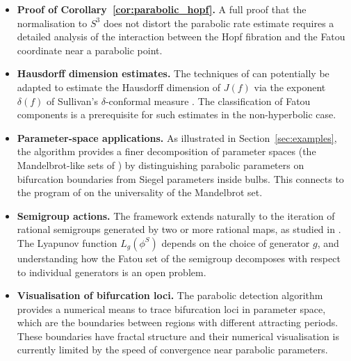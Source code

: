 \documentclass[12pt]{article}
\theoremstyle{definition}
\begin{document}
\begin{itemize}
  \item \textbf{Proof of Corollary~\ref{cor:parabolic_hopf}.}  A
        full proof that the normalisation to $S^3$ does not distort the
        parabolic rate estimate requires a detailed analysis of the
        interaction between the Hopf fibration and the Fatou coordinate
        near a parabolic point.

  \item \textbf{Hausdorff dimension estimates.}  The techniques of
        \cite{Alvarez2023} can potentially be adapted to estimate the
        Hausdorff dimension of $J(f)$ via the exponent $\delta(f)$ of
        Sullivan's $\delta$-conformal measure \cite{Sullivan1983,
        Gelfert2010}.  The classification of Fatou components is a
        prerequisite for such estimates in the non-hyperbolic case.

  \item \textbf{Parameter-space applications.}  As illustrated in
        Section~\ref{sec:examples}, the algorithm provides a finer
        decomposition of parameter spaces (the Mandelbrot-like sets of
        \cite{Alvarez2023}) by distinguishing parabolic parameters on
        bifurcation boundaries from Siegel parameters inside bulbs.
        This connects to the program of \cite{McMullen1987} on the
        universality of the Mandelbrot set.

  \item \textbf{Semigroup actions.}  The framework extends naturally to
        the iteration of rational semigroups generated by two or more
        rational maps, as studied in \cite{HinkkaneMartin1996}.  The Lyapunov function $L_g(\phi^S)$ depends on
        the choice of generator $g$, and understanding how the Fatou
        set of the semigroup decomposes with respect to individual
        generators is an open problem.

  \item \textbf{Visualisation of bifurcation loci.}  The parabolic
        detection algorithm provides a numerical means to trace
        bifurcation loci in parameter space, which are the boundaries
        between regions with different attracting periods.  These
        boundaries have fractal structure and their numerical
        visualisation is currently limited by the speed of convergence
        near parabolic parameters.


\end{itemize}
\end{document}
